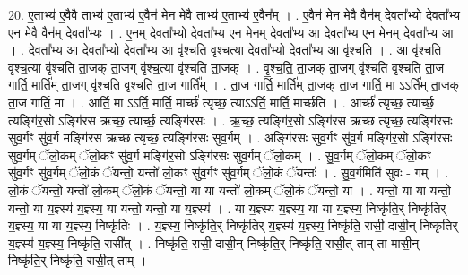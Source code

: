 \documentclass[17pt]{extarticle}
\begin{document}
20. ए॒ताभ्य॑ ए॒वैवै ताभ्य॑ ए॒ताभ्य॑ ए॒वैन॑ मेन मे॒वै ताभ्य॑ ए॒ताभ्य॑ ए॒वैन᳚म् । . ए॒वैन॑ मेन मे॒वै वैन॑म् दे॒वता᳚भ्यो दे॒वता᳚भ्य एन मे॒वै वैन॑म् दे॒वता᳚भ्यः । . ए॒न॒म् दे॒वता᳚भ्यो दे॒वता᳚भ्य एन मेनम् दे॒वता᳚भ्य॒ आ दे॒वता᳚भ्य एन मेनम् दे॒वता᳚भ्य॒ आ । . दे॒वता᳚भ्य॒ आ दे॒वता᳚भ्यो दे॒वता᳚भ्य॒ आ वृ॑श्चति वृश्च॒त्या दे॒वता᳚भ्यो दे॒वता᳚भ्य॒ आ वृ॑श्चति । . आ वृ॑श्चति वृश्च॒त्या वृ॑श्चति ता॒जक् ता॒जग् वृ॑श्च॒त्या वृ॑श्चति ता॒जक् । . वृ॒श्च॒ति॒ ता॒जक् ता॒जग् वृ॑श्चति वृश्चति ता॒ज गार्ति॒ मार्ति॑म् ता॒जग् वृ॑श्चति वृश्चति ता॒ज गार्ति᳚म् । . ता॒ज गार्ति॒ मार्ति॑म् ता॒जक् ता॒ज गार्ति॒ मा ऽऽर्ति॑म् ता॒जक् ता॒ज गार्ति॒ मा । . आर्ति॒ मा ऽऽर्ति॒ मार्ति॒ मार्च्छ॑ त्यृच्छ॒ त्याऽऽर्ति॒ मार्ति॒ मार्च्छ॑ति । . आर्च्छ॑ त्यृच्छ॒ त्यार्च्छ॒ त्यङ्गि॑र॒सो ऽङ्गि॑रस ऋच्छ॒ त्यार्च्छ॒ त्यङ्गि॑रसः । . ऋ॒च्छ॒ त्यङ्गि॑र॒सो ऽङ्गि॑रस ऋच्छ त्यृच्छ॒ त्यङ्गि॑रसः सुव॒र्गꣳ सु॑व॒र्ग मङ्गि॑रस ऋच्छ त्यृच्छ॒ त्यङ्गि॑रसः सुव॒र्गम् । . अङ्गि॑रसः सुव॒र्गꣳ सु॑व॒र्ग मङ्गि॑र॒सो ऽङ्गि॑रसः सुव॒र्गम् ॅलो॒कम् ॅलो॒कꣳ सु॑व॒र्ग मङ्गि॑र॒सो ऽङ्गि॑रसः सुव॒र्गम् ॅलो॒कम् । . सु॒व॒र्गम् ॅलो॒कम् ॅलो॒कꣳ सु॑व॒र्गꣳ सु॑व॒र्गम् ॅलो॒कं ॅयन्तो॒ यन्तो॑ लो॒कꣳ सु॑व॒र्गꣳ सु॑व॒र्गम् ॅलो॒कं ॅयन्तः॑ । . सु॒व॒र्गमिति॑ सुवः - गम् । . लो॒कं ॅयन्तो॒ यन्तो॑ लो॒कम् ॅलो॒कं ॅयन्तो॒ या या यन्तो॑ लो॒कम् ॅलो॒कं ॅयन्तो॒ या । . यन्तो॒ या या यन्तो॒ यन्तो॒ या य॒ज्ञ्स्य॑ य॒ज्ञ्स्य॒ या यन्तो॒ यन्तो॒ या य॒ज्ञ्स्य॑ । . या य॒ज्ञ्स्य॑ य॒ज्ञ्स्य॒ या या य॒ज्ञ्स्य॒ निष्कृ॑ति॒र् निष्कृ॑तिर् य॒ज्ञ्स्य॒ या या य॒ज्ञ्स्य॒ निष्कृ॑तिः । . य॒ज्ञ्स्य॒ निष्कृ॑ति॒र् निष्कृ॑तिर् य॒ज्ञ्स्य॑ य॒ज्ञ्स्य॒ निष्कृ॑ति॒ रासी॒ दासी॒न् निष्कृ॑तिर् य॒ज्ञ्स्य॑ य॒ज्ञ्स्य॒ निष्कृ॑ति॒ रासी᳚त् । . निष्कृ॑ति॒ रासी॒ दासी॒न् निष्कृ॑ति॒र् निष्कृ॑ति॒ रासी॒त् ताम् ता मासी॒न् निष्कृ॑ति॒र् निष्कृ॑ति॒ रासी॒त् ताम् । \newline
\end{document}
